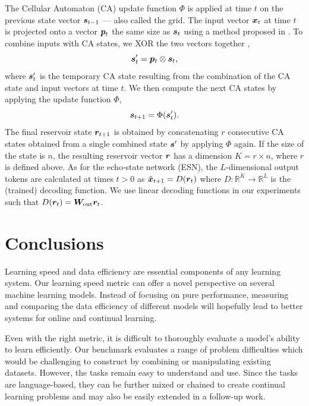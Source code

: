 The Cellular Automaton (CA) update function $\Phi$ is applied at time $t$ on the previous state vector
${\bm{s}}_{t - 1}$ --- also called the grid. The input vector ${\bm{x}}_{t}$ at time $t$ is
projected onto a vector ${\bm{p}}_{t}$ the same size as ${\bm{s}}_{t}$ using a method proposed in
\cite{yilmazReservoirComputingUsing2014}. To combine inputs with CA states,
we XOR the two vectors together
\cite{gloverDynamicalLandscapeReservoir2021},
\begin{equation}
  \label{eq:ca-xor}
  {\bm{s}}'_{t} = {\bm{p}}_{t}\otimes {\bm{s}}_{t},
\end{equation}
where ${\bm{s}}'_{t}$ is the temporary CA state resulting from the combination of the
CA state and input vectors at time $t$. We then compute the next CA states by
applying the update function $\Phi$,
\begin{equation}
  \label{eq:ca-state}
  {\bm{s}}_{t + 1} = \Phi({\bm{s}}'_{t}).
\end{equation}
The final reservoir state ${\bm{r}}_{t + 1}$ is obtained by concatenating $r$ consecutive CA
states obtained from a single combined state ${\bm{s}}'$ by applying $\Phi$ again. If
the size of the state is $n$, the resulting reservoir vector ${\bm{r}}$ has a dimension
$K = r \times n$, where $r$ is defined above. As for the echo-state network (ESN), the $L$-dimensional output tokens are
calculated at times $t > 0$ as $\tilde{{\bm{x}}}_{t+ 1} = D({\bm{r}}_{t})$ where
$D: \mathbb{R}^{K} \rightarrow \mathbb{R}^{L}$ is the (trained) decoding function. We use linear decoding functions in
our experiments such that $D({\bm{r}}_{t}) = {\bm{W}}_{\text{out}}{\bm{r}}_{t}$.

\section{Conclusions}

Learning speed and data efficiency are essential components of any learning
system. Our learning speed metric can offer a novel perspective on several
machine learning models.
Instead of focusing on pure performance, measuring and comparing the data
efficiency of different models will hopefully lead to better systems for online
and continual learning.


Even with the right metric, it is difficult to thoroughly evaluate a model's
ability to learn efficiently. Our benchmark evaluates a range of problem
difficulties which would be challenging to construct by combining or
manipulating existing datasets.
However, the tasks remain easy to understand and use. Since the tasks are
language-based, they can be further mixed or chained to create continual
learning problems and may also be easily extended in a follow-up work.

